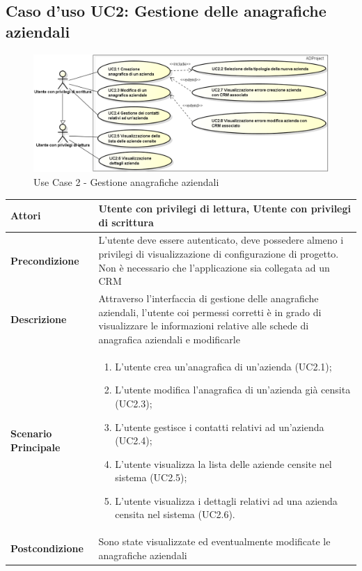 	\subsection{Caso d'uso UC2: Gestione delle anagrafiche aziendali}
	\begin{figure}[H]
		\centering
		\includegraphics[scale=0.50]{images/useCase/UC2}
		\caption{Use Case 2 - Gestione anagrafiche aziendali}
		\label{fig:uc2}
	\end{figure}
	\begin{longtable}{ | p{2.7cm} | p{12cm} |}
		\hline \textbf{Attori} & Utente con privilegi di lettura, Utente con privilegi di scrittura\\
		\hline \textbf{Precondizione} &  L’utente deve essere autenticato, deve possedere almeno i privilegi di visualizzazione di configurazione di progetto. Non è necessario che l’applicazione sia collegata ad un CRM\\ 
		\hline \textbf{Descrizione} & Attraverso l’interfaccia di gestione delle anagrafiche aziendali, l’utente coi permessi corretti è in grado di visualizzare le informazioni relative alle schede di anagrafica aziendali e modificarle\\ 
		\hline \textbf{Scenario Principale} & \begin{enumerate}
			\itemsep-0.5em 
			\item L’utente crea un’anagrafica di un’azienda  (UC2.1);
			\item L’utente modifica l’anagrafica di un’azienda già censita  (UC2.3);
			\item L’utente gestisce i contatti relativi ad un’azienda  (UC2.4);
			\item L’utente visualizza la lista delle aziende censite nel sistema  (UC2.5);
			\item L’utente visualizza i dettagli relativi ad una azienda censita nel sistema  (UC2.6).
			
		\end{enumerate}
		\\ 
		\hline \textbf{Postcondizione} & Sono state visualizzate ed eventualmente modificate le anagrafiche aziendali\\ 
		\hline 
	\end{longtable}
	
